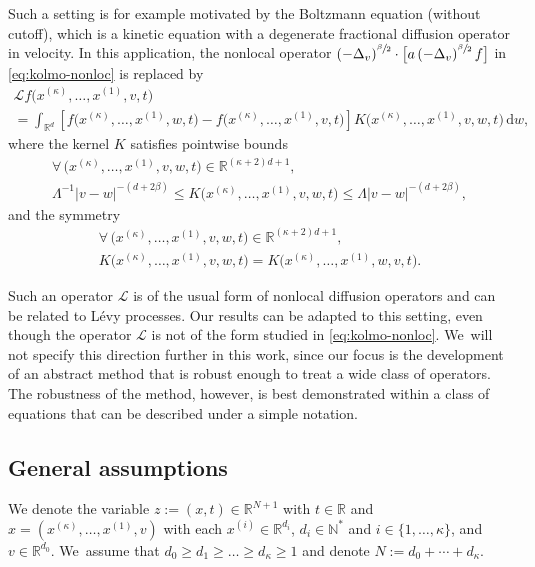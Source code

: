 \documentclass[10pt]{amsart}
\theoremstyle{definition}
\newcommand\N{{\mathbb N}}
\newcommand\R{{\mathbb R}}
\newcommand{\dd}{{\, \mathrm d}}
\begin{document}
Such a setting is for example motivated by the Boltzmann equation (without
cutoff), which is a kinetic equation with a degenerate fractional diffusion
operator in velocity. In this application, the nonlocal operator
$\left(- \Delta_v \right)^{\sfrac{\beta}{2}} \cdot \bigl[ a \left(- \Delta_v \right)^{\sfrac{\beta}{2}} f \bigr]$
in \eqref{eq:kolmo-nonloc} is replaced by
\begin{multline*}
\mathcal L f\bigl(x^{(\kappa)},\dots,x^{(1)},v,t\bigr) \\
= \int_{\R^d} \left[ f\bigl(x^{(\kappa)},\dots,
x^{(1)},w,t\bigr) -f\bigl(x^{(\kappa)},\dots,x^{(1)},v,t
\bigr) \right]
K\bigl(x^{(\kappa)},\dots,x^{(1)},v,w,t\bigr) \dd w,
\end{multline*}
where the kernel $K$ satisfies pointwise bounds
\begin{multline}
\forall \, \bigl(x^{(\kappa)},\dots,x^{(1)},v,w,t\bigr)
\in \R^{(\kappa+2)d+1}, \\
\label{eq:elliptic-nonloc}
\Lambda^{-1} \big\vert v - w\big\vert^{-(d+2\beta)} \leq
K\bigl(x^{(\kappa)},\dots,x^{(1)},v,w,t\bigr) \leq \Lambda
\big\vert v - w\big\vert^{-(d+2\beta)},
\end{multline}
and the symmetry
\begin{multline}
\forall \, \bigl(x^{(\kappa)},\dots,x^{(1)},v,w,t\bigr)
\in \R^{(\kappa+2)d+1},\\
\label{eq:symmetry-nonloc}
K\bigl(x^{(\kappa)},\dots,x^{(1)},v,w,t\bigr) =
K\bigl(x^{(\kappa)},\dots,x^{(1)},w,v,t\bigr).
\end{multline}

Such an operator \(\mathcal L\) is of the usual form of nonlocal diffusion
operators and can be related to Lévy processes. Our results can be adapted to
this setting, even though the operator \(\mathcal L\) is not of the form studied
in \eqref{eq:kolmo-nonloc}. We~will not specify this direction further in this
work, since our focus is the development of an abstract method that is robust
enough to treat a wide class of operators. The robustness of the method,
however, is best demonstrated within a class of equations that can be described
under a simple notation.

\subsection{General assumptions}\label{subsec:H}
We denote the variable $z:=(x,t) \in \R^{N+1}$ with $t \in \R$ and
$x=(x^{(\kappa)},\dots,x^{(1)},v)$ with each
$x^{(i)} \in \R^{d_i}$, $d_i \in \N^*$ and
$i \in \{1,\dots,\kappa\}$, and $v \in \R^{d_0}$. We~assume that
$d_0 \geq d_1 \geq \dots \geq d_{\kappa}\geq 1$ and denote
$N:=d_0+\cdots+d_\kappa$.
\end{document}
